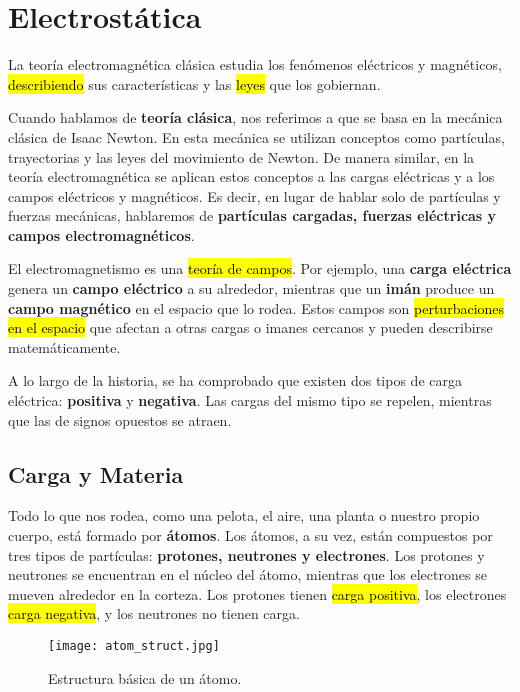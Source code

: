 \section{Electrostática}

La teoría electromagnética clásica estudia los fenómenos eléctricos y magnéticos, \hl{describiendo} sus características y las \hl{leyes} que los gobiernan.  

Cuando hablamos de \textbf{teoría clásica}, nos referimos a que se basa en la mecánica clásica de Isaac Newton. En esta mecánica se utilizan conceptos como partículas, trayectorias y las leyes del movimiento de Newton. De manera similar, en la teoría electromagnética se aplican estos conceptos a las cargas eléctricas y a los campos eléctricos y magnéticos. Es decir, en lugar de hablar solo de partículas y fuerzas mecánicas, hablaremos de \textbf{partículas cargadas, fuerzas eléctricas y campos electromagnéticos}.  

El electromagnetismo es una \hl{teoría de campos}. Por ejemplo, una \textbf{carga eléctrica} genera un \textbf{campo eléctrico} a su alrededor, mientras que un \textbf{imán} produce un \textbf{campo magnético} en el espacio que lo rodea. Estos campos son \hl{perturbaciones en el espacio} que afectan a otras cargas o imanes cercanos y pueden describirse matemáticamente.  

A lo largo de la historia, se ha comprobado que existen dos tipos de carga eléctrica: \textbf{positiva} y \textbf{negativa}. Las cargas del mismo tipo se repelen, mientras que las de signos opuestos se atraen.  

\subsection{Carga y Materia}

Todo lo que nos rodea, como una pelota, el aire, una planta o nuestro propio cuerpo, está formado por \textbf{átomos}. Los átomos, a su vez, están compuestos por tres tipos de partículas: \textbf{protones, neutrones y electrones}. Los protones y neutrones se encuentran en el núcleo del átomo, mientras que los electrones se mueven alrededor en la corteza. Los protones tienen \hl{carga positiva}, los electrones \hl{carga negativa}, y los neutrones no tienen carga. 

\begin{figure}[ht]
    \centering
    \texttt{[image: atom\_struct.jpg]}
    \caption{Estructura básica de un átomo.}
    \label{fig:atom_struct}
\end{figure}

